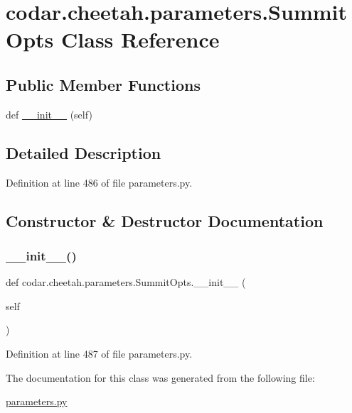 \hypertarget{classcodar_1_1cheetah_1_1parameters_1_1_summit_opts}{}\section{codar.\+cheetah.\+parameters.\+Summit\+Opts Class Reference}
\label{classcodar_1_1cheetah_1_1parameters_1_1_summit_opts}
\subsection*{Public Member Functions}
\begin{DoxyCompactItemize}
\item 
def \hyperlink{classcodar_1_1cheetah_1_1parameters_1_1_summit_opts_af6fc797d0f898578303c36ea352efbe3}{\+\_\+\+\_\+init\+\_\+\+\_\+} (self)
\end{DoxyCompactItemize}


\subsection{Detailed Description}


Definition at line 486 of file parameters.\+py.



\subsection{Constructor \& Destructor Documentation}
\mbox{\label{classcodar_1_1cheetah_1_1parameters_1_1_summit_opts_af6fc797d0f898578303c36ea352efbe3}} 
\subsubsection{\texorpdfstring{\+\_\+\+\_\+init\+\_\+\+\_\+()}{\_\_init\_\_()}}
{\footnotesize\ttfamily def codar.\+cheetah.\+parameters.\+Summit\+Opts.\+\_\+\+\_\+init\+\_\+\+\_\+ (\begin{DoxyParamCaption}\item[{}]{self }\end{DoxyParamCaption})}



Definition at line 487 of file parameters.\+py.



The documentation for this class was generated from the following file\+:\begin{DoxyCompactItemize}
\item 
\hyperlink{parameters_8py}{parameters.\+py}\end{DoxyCompactItemize}
